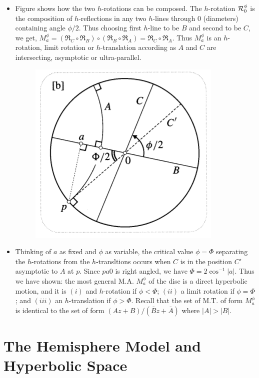 \documentclass[12pt]{article}
\def\mc{\ensuremath\mathcal}
\begin{document}
\begin{itemize}
    \item Figure shows how the two $h$-rotations can be composed. The $h$-rotation $\mc{R}^{\phi}_{0}$ is the composition of $h$-reflections in any two $h$-lines through $0$ (diameters) containing angle $\phi/2$. Thus choosing first $h$-line to be $B$ and second to be $C$, we get, $M_{a}^{\phi} = (\Re_{C}\circ \Re_{B}) \circ (\Re_{B} \circ \Re_{A}) = \Re_{C} \circ \Re_{A}$. Thus $M_a^{\phi}$ is an $h$-rotation, limit rotation or $h$-translation according as $A$ and $C$ are intersecting, asymptotic or ultra-parallel.

    \begin{figure}[h!]
        \centering
        \includegraphics[scale=0.7]{fig_35}
        \label{fig_35}
    \end{figure}

    \item Thinking of $a$ as fixed and $\phi$ as variable, the critical value $\phi=\Phi$ separating the $h$-rotations from the $h$-transltions occurs when $C$ is in the position $C'$ asymptotic to $A$ at $p$. Since $pa0$ is right angled, we have $\Phi = 2\cos^{-1}|a|$. Thus we have shown: the most general M.A. $M_a^{\phi}$ of the disc is a direct hyperbolic motion, and it is $(i)$ and $h$-rotation if $\phi<\Phi$; $(ii)$ a limit rotation if $\phi=\Phi$; and $(iii)$ an $h$-translation if $\phi>\Phi$. Recall that the set of M.T. of form $M_a^{\phi}$ is identical to the set of form $(Az+B)/(\bar{B}z+\bar{A})$ where $|A|>|B|$.
\end{itemize}

\section{The Hemisphere Model and Hyperbolic Space}
\end{document}
